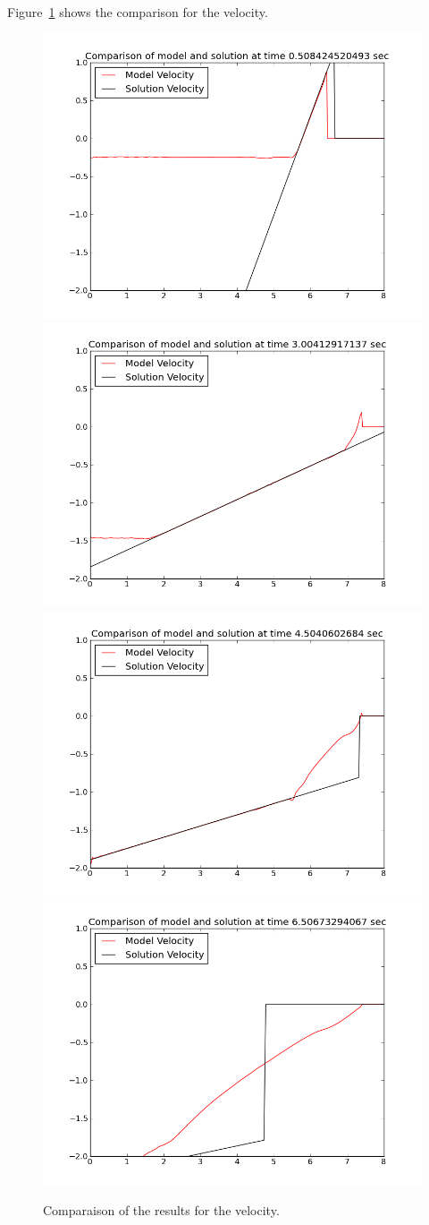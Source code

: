 Figure~\ref{fig:swash:res_vel} shows the comparison for the velocity.

\begin{figure}[H]
\centering
\includegraphics[width=.5\textwidth]{img/res_vel_t0_5.png}
\includegraphics[width=.5\textwidth]{img/res_vel_t3_0.png}
\includegraphics[width=.5\textwidth]{img/res_vel_t4_5.png}
\includegraphics[width=.5\textwidth]{img/res_vel_t6_5.png}
\caption{Comparaison of the results for the velocity.}
\label{fig:swash:res_vel}
\end{figure}
